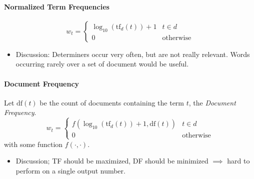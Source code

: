             \paragraph{Normalized Term Frequencies} %
                \begin{equation*}
                    w_t =
                    	\begin{cases}
	                    	\log_{10}(\text{tf}_d(t)) + 1 & t \in d \\
	                    	0 & \text{otherwise}
                    	\end{cases}
                \end{equation*}
                
                \begin{itemize}
                	\item Discussion: Determiners occur very often, but are not really relevant. Words occurring rarely over a set of document would be useful.
                \end{itemize}

            \paragraph{Document Frequency} %
            	Let \( \text{df}(t) \) be the count of documents containing the term \(t\), the \textit{Document Frequency}.
                \begin{equation*}
                    w_t =
                    	\begin{cases}
	                    	f(\log_{10}(\text{tf}_d(t)) + 1, \text{df}(t)) & t \in d \\
	                    	0 & \text{otherwise}
                    	\end{cases}
                \end{equation*}
                with some function \( f(\cdot, \cdot) \).
                
                \begin{itemize}
                	\item Discussion; TF should be maximized, DF should be minimized \(\implies\) hard to perform on a single output number.
                \end{itemize}

